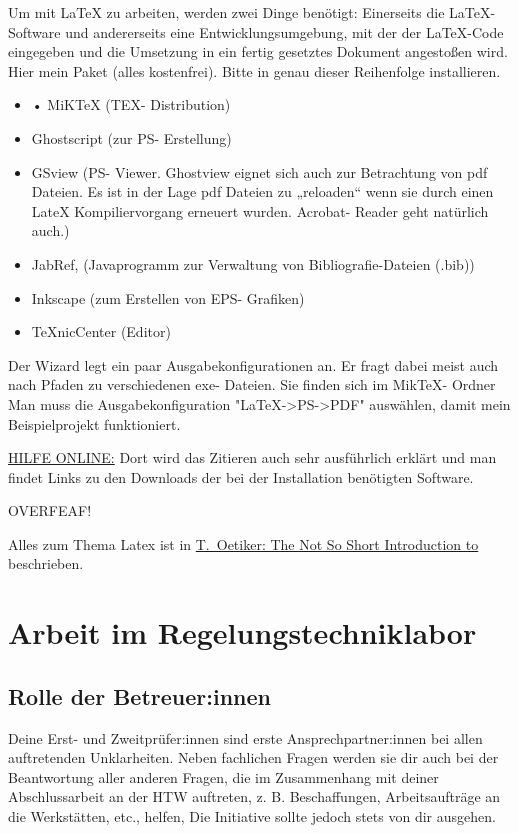 Um mit LaTeX zu arbeiten, werden zwei Dinge benötigt: Einerseits die LaTeX-Software und andererseits eine Entwicklungsumgebung, mit der der LaTeX-Code eingegeben und die Umsetzung in ein fertig gesetztes Dokument angestoßen wird. Hier mein Paket (alles kostenfrei). Bitte in genau dieser Reihenfolge installieren.

\begin{itemize}
    \item • MiKTeX (TEX- Distribution)
\item Ghostscript (zur PS- Erstellung)
\item GSview (PS- Viewer. Ghostview eignet sich auch zur Betrachtung von pdf Dateien. Es ist in der Lage pdf Dateien zu „reloaden“ wenn sie durch einen LateX Kompiliervorgang erneuert wurden. Acrobat- Reader geht natürlich auch.)
\item JabRef, (Javaprogramm zur Verwaltung von Bibliografie-Dateien (.bib))
\item Inkscape (zum Erstellen von EPS- Grafiken)
\item TeXnicCenter (Editor)
\end{itemize}

Der Wizard legt ein paar Ausgabekonfigurationen an. Er fragt dabei meist auch nach Pfaden zu verschiedenen exe- Dateien. Sie finden sich im MikTeX- Ordner 
Man muss die Ausgabekonfiguration "LaTeX->PS->PDF" auswählen, damit mein Beispielprojekt funktioniert. 

\hyperlink {https://latex.tugraz.at/}{HILFE ONLINE:}
Dort wird das Zitieren auch sehr ausführlich erklärt und man findet Links zu den Downloads der bei der Installation benötigten Software.

OVERFEAF!




Alles zum Thema Latex ist in
\href{https://tobi.oetiker.ch/lshort/lshort.pdf}{T.~Oetiker: The Not So Short Introduction to \LaTeXe}
beschrieben.

\section{Arbeit im Regelungstechniklabor}

\subsection{Rolle der Betreuer:innen}
Deine Erst- und Zweitprüfer:innen sind erste Ansprechpartner:innen bei allen auftretenden Unklarheiten. Neben fachlichen Fragen werden sie dir auch bei der Beantwortung aller anderen Fragen, die im Zusammenhang mit deiner Abschlussarbeit an der HTW auftreten, z. B. Beschaffungen, Arbeitsaufträge an die Werkstätten, etc., helfen,  Die Initiative sollte jedoch stets von dir ausgehen.


